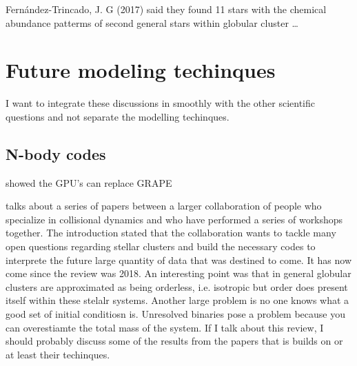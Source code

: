         Fernández-Trincado, J. G (2017) said they found 11 stars with the chemical abundance patterms of second general stars within globular cluster \dots 

\section{Future modeling techinques}

    I want to integrate these discussions in smoothly with the other scientific questions and not separate the modelling techinques. 

    \subsection{N-body codes}
    \citep{2012MNRAS.424..545N} showed the GPU's can replace GRAPE

    \citet{2018ComAC...5....2V} talks about a series of papers between a larger collaboration of people who specialize in collisional dynamics and who have performed a series of workshops together. The introduction stated that the collaboration wants to tackle many open questions regarding stellar clusters and build the necessary codes to interprete the future large quantity of data that was destined to come. It has now come since the review was 2018. An interesting point was that in general globular clusters are approximated as being orderless, i.e. isotropic but order does present itself within these stelalr systems. Another large problem is no one knows what a good set of initial conditiosn is. Unresolved binaries pose a problem because you can overestiamte the total mass of the system. If I talk about this review, I should probably discuss some of the results from the papers that is builds on or at least their techinques.

